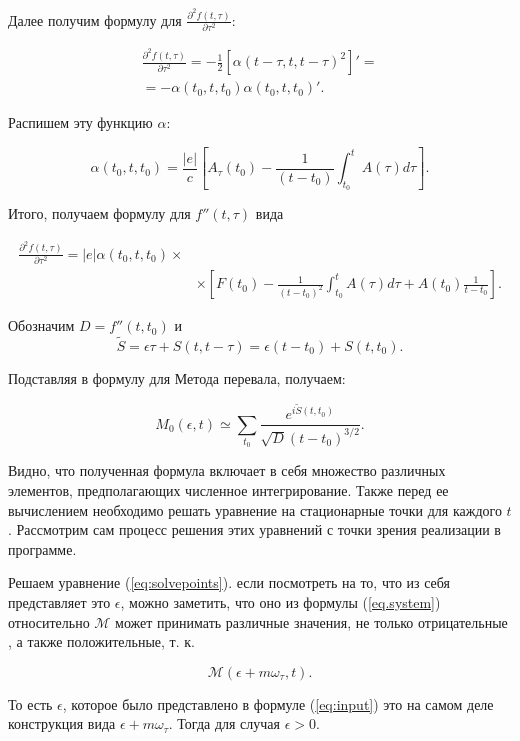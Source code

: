 \documentclass[%
bachelor,    %
natbib,      %
subf,        %
href,        %
colorlinks,  %
]{disser}
\newcommand{\cM}{\mathcal{M}}
\begin{document}
Далее получим формулу для $\frac{\partial^2 f(t, \tau)}{\partial\tau^2}$:

\begin{eqnarray}
\frac{\partial^2 f(t, \tau)}{\partial\tau^2} = -\frac{1}{2}\left[\alpha(t-\tau, t, t-\tau)^2\right]' = \nonumber \\
= -\alpha(t_0, t, t_0) \alpha(t_0, t, t_0)'. \nonumber
\end{eqnarray}

Распишем эту функцию $\alpha$:

$$
\alpha(t_0, t, t_0) = \frac{|e|}{c} \left[A_{\tau}(t_0) - \frac{1}{(t-t_0)}\int_{t_0}^{t}A(\tau) d\tau\right].
$$

Итого, получаем формулу для $f''(t, \tau)$ вида

\begin{eqnarray}
\frac{\partial^2 f(t, \tau)}{\partial\tau^2} = |e|\alpha(t_0, t, t_0) \times \nonumber \\
& \times \left[F(t_0) - \frac{1}{(t - t_0)^2} \int_{t_0}^{t}A(\tau)d\tau + A(t_0) \frac{1}{t-t_0} \right] \nonumber.
\end{eqnarray}


Обозначим $D = f''(t, t_0)$ и $$\widetilde{S} = \epsilon \tau + S(t, t-\tau) = \epsilon(t-t_0) + S(t, t_0).$$

Подставляя в формулу для Метода перевала, получаем:

\begin{equation}\label{eq:out}
M_0(\epsilon, t) \simeq \sum_{t_0}\frac{e^{i\widetilde{S}(t, t_0)} }{\sqrt{D} (t-t_0)^{3/2}}.
\end{equation}

Видно, что полученная формула включает в себя множество различных элементов, предполагающих численное интегрирование. Также перед ее вычислением необходимо решать уравнение на стационарные точки для каждого $t$. Рассмотрим сам процесс решения этих уравнений с точки зрения реализации в программе.

Решаем уравнение (\ref{eq:solvepoints}). если посмотреть на то, что из себя представляет это $\epsilon$, можно заметить, что оно из формулы (\ref{eq.system}) относительно $\cM$ может принимать различные значения, не только отрицательные , а также положительные, т. к.

$$
\cM(\epsilon+m\omega_\tau,t).
$$

То есть $\epsilon$, которое было представлено в формуле (\ref{eq:input}) это на самом деле конструкция вида $\epsilon+m\omega_\tau$. Тогда для случая $\epsilon > 0$.
\end{document}
